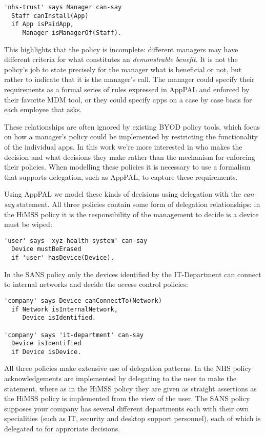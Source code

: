 \documentclass[a4paper]{article}
\begin{document}
\begin{lstlisting}[title={\footnotesize\textbf{NHS}:\itshape
Use of paid apps must be agreed in advance with the device holder's line manager and their should be a demonstrable benefit.}]
'nhs-trust' says Manager can-say
  Staff canInstall(App)
  if App isPaidApp,
     Manager isManagerOf(Staff).
\end{lstlisting}

This highlights that the policy is incomplete: different managers may have different criteria for what constitutes an \emph{demonstrable benefit}.
It is not the policy's job to state precisely for the manager what is beneficial or not, but rather to indicate that it is the manager's call.
The manager could specify their requirements as a formal series of rules expressed in AppPAL and enforced by their favorite \ac{MDM} tool, or they could specify apps on a case by case basis for each employee that asks.

These relationships are often ignored by existing BYOD policy tools, which focus on how a manager's policy could be implemented by restricting the functionality of the individual apps.  In this work we're more interested in who makes the decision and what decisions they make rather than the mechanism for enforcing their policies.  When modelling these policies it is necessary to use a formalism that supports delegation, such as AppPAL, to capture these requirements.

Using AppPAL we model these kinds of decisions using delegation with the \emph{can-say} statement.
All three policies contain some form of delegation relationships: in the \ac{HiMSS} policy it is the responsibility of the management to decide is a device must be wiped:
\begin{lstlisting}[title={\footnotesize\textbf{\ac{HiMSS}}:\itshape
I agree that the PDA/Smartphone can be wiped by XYZ Health System upon the decision of XYZ Health System management.}]
'user' says 'xyz-health-system' can-say
  Device mustBeErased
  if 'user' hasDevice(Device).
\end{lstlisting}
In the SANS policy only the devices identified by the IT-Department can connect to internal networks and decide the access control policies:
\begin{lstlisting}[title={\footnotesize\textbf{\ac{HiMSS}}:\itshape
All devices, including handhelds that have to connect to internal networks MUST be identified by IT department}]
'company' says Device canConnectTo(Network)
  if Network isInternalNetwork,
     Device isIdentified.

'company' says 'it-department' can-say
  Device isIdentified
  if Device isDevice.
\end{lstlisting}
All three policies make extensive use of delegation patterns. 
In the NHS policy acknowledgements are implemented by delegating to the user to make the statement, where as in the \ac{HiMSS} policy they are given as straight assertions as the \ac{HiMSS} policy is implemented from the view of the user. The SANS policy supposes your company has several different departments each with their own specialities (such as IT, security and desktop support personnel), each of which is delegated to for approriate decisions.
\end{document}
